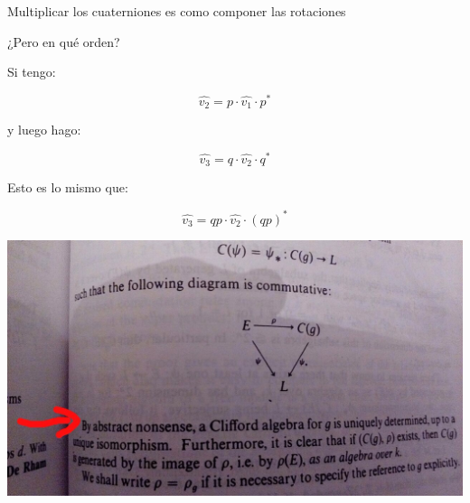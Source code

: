 \documentclass[10pt]{beamer}
\begin{document}
\begin{frame}{Multiplicar los cuaterniones es como componer las rotaciones}

    ¿Pero en qué orden? \pause
    
    Si tengo:
    
    $$\hat{v_2} = p \cdot \hat{v_1} \cdot p^*$$
    
    y luego hago:
    
    $$\hat{v_3} = q \cdot \hat{v_2} \cdot q^*$$ \pause
    
    Esto es lo mismo que:
    
    $$\hat{v_3} = qp \cdot \hat{v_2} \cdot (qp)^*$$
    
\end{frame}
\begin{frame}

    \includegraphics[scale=0.4]{nonsense.JPG}
    
\end{frame}
\end{document}
